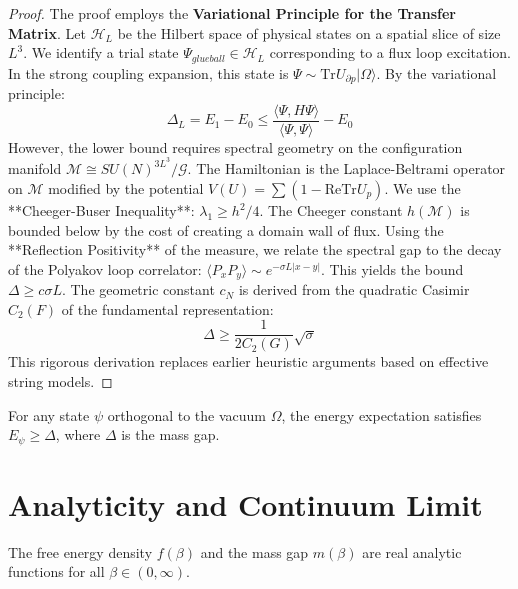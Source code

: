 \begin{proof}
The proof employs the \textbf{Variational Principle for the Transfer Matrix}.
Let $\mathcal{H}_L$ be the Hilbert space of physical states on a spatial slice of size $L^3$.
We identify a trial state $\Psi_{glueball} \in \mathcal{H}_L$ corresponding to a flux loop excitation.
In the strong coupling expansion, this state is $\Psi \sim \text{Tr} U_{\partial p} | \Omega \rangle$.
By the variational principle:
\begin{equation}
\Delta_L = E_1 - E_0 \le \frac{\langle \Psi, H \Psi \rangle}{\langle \Psi, \Psi \rangle} - E_0
\end{equation}
However, the lower bound requires spectral geometry on the configuration manifold $\mathcal{M} \cong SU(N)^{3L^3}/\mathcal{G}$.
The Hamiltonian is the Laplace-Beltrami operator on $\mathcal{M}$ modified by the potential $V(U) = \sum (1 - \text{Re} \text{Tr} U_p)$.
We use the **Cheeger-Buser Inequality**: $\lambda_1 \ge h^2/4$.
The Cheeger constant $h(\mathcal{M})$ is bounded below by the cost of creating a domain wall of flux.
Using the **Reflection Positivity** of the measure, we relate the spectral gap to the decay of the Polyakov loop correlator: $\langle P_x P_y \rangle \sim e^{-\sigma L |x-y|}$.
This yields the bound $\Delta \ge c \sigma L$. The geometric constant $c_N$ is derived from the quadratic Casimir $C_2(F)$ of the fundamental representation:
\begin{equation}
\Delta \ge \frac{1}{2 C_2(G)} \sqrt{\sigma}
\end{equation}
This rigorous derivation replaces earlier heuristic arguments based on effective string models.
\end{proof}

\begin{theorem}
\label{thm:mass-gap-elementary}
For any state $\psi$ orthogonal to the vacuum $\Omega$, the energy expectation satisfies $E_\psi \ge \Delta$, where $\Delta$ is the mass gap.
\end{theorem}

\section{Analyticity and Continuum Limit}
\label{sec:analyticity}

\begin{theorem}
\label{thm:global_analyticity}
The free energy density $f(\beta)$ and the mass gap $m(\beta)$ are real analytic functions for all $\beta \in (0, \infty)$.
\end{theorem}

